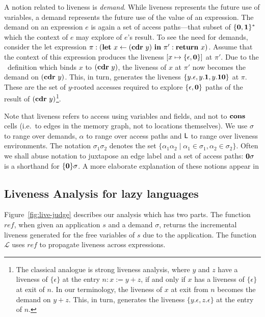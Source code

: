 \documentclass[9pt]{sigplanconf}
\begin{document}
A  notion  related  to  liveness  is  {\em  demand}.   While  liveness
represents the future use of variables, a demand represents the future
use of the value of an  expression. The demand on an expression $e$ is
again a  set of  access paths---that subset  of $\{\mathbf{0},\mathbf{1}\}^\ast$
which the context of $e$ may explore of $e$'s result.  To see the need
for  demands,  consider   the  let  expression  $\pi:(\mbox{$\mathbf{ let}$}~x\leftarrow
(\mbox{$\mathbf{cdr}$}~y)~\mbox{$\mathbf{ in}$}~  \pi':\mbox{$\mathbf{ return}$}~x)$.   Assume that  the  context of  this
expression produces  the liveness $[x \mapsto  \lbrace \epsilon, \mathbf{0}
  \rbrace]$ at $\pi'$.  Due to the \LET\ definition which binds $x$ to
$(\mbox{$\mathbf{cdr}$}~y)$, the  liveness of $x$ at  $\pi'$ now becomes  the demand on
$(\mbox{$\mathbf{cdr}$}~y)$.    This,  in   turn,  generates   the   liveness  $\lbrace
y.\epsilon, y.\mathbf{1}, y.\mathbf{1}\mathbf{0} \rbrace$ at $\pi$. These are the set
of $y$-rooted  accesses required  to explore $\lbrace  \epsilon, \mathbf{0}
\rbrace$  paths of  the result  of  $(\mbox{$\mathbf{cdr}$}~y)$\footnote{The classical
  analogue  is strong  liveness analysis,  where  $y$ and  $z$ have  a
  liveness of  $\lbrace\epsilon\rbrace$ at  the entry $n:  x:=y+z$, if
  and only if  $x$ has a liveness of  $\lbrace\epsilon\rbrace$ at exit
  of $n$.   In our terminology, the  liveness of $x$ at  exit from $n$
  becomes the demand on $y+z$.   This, in turn, generates the liveness
  $\lbrace y.\epsilon, z.\epsilon \rbrace$ at the entry of $n$.}.


Note that  liveness refers to  access using variables and  fields, and
not  to $\mbox{$\mathbf{cons}$}$  cells (i.e.\  to edges  in the  memory graph,  not to
locations themselves).
We use $\sigma$  to range over demands, $\alpha$  to range over access
paths  and $\mathsf{L}$ to  range over  liveness environments.   The notation
$\sigma_1\sigma_2$  denotes  the  set $\lbrace  \alpha_1\alpha_2  \mid
\alpha_1 \in \sigma_1, \alpha_2  \in \sigma_2\rbrace$.  Often we shall
abuse notation to  juxtapose an edge label and a  set of access paths:
$\mathbf{0}\sigma$ is a shorthand for $\lbrace\mathbf{0}\rbrace\sigma$. A more
elaborate explanation of these notions appear in \cite{asati14lgc}


\subsection{Liveness Analysis for lazy languages}

Figure~\ref{fig:live-judge}  describes  our  analysis  which  has  two
parts. The function $\mathit{ref}$,  when given an application $s$ and
a demand $\sigma$, returns  the incremental liveness generated for the
free  variables   of  $s$  due  to  the   application.   The  function
$\mathcal{L}$  uses   $\mathit{ref}$  to  propagate   liveness  across
expressions.
\end{document}
